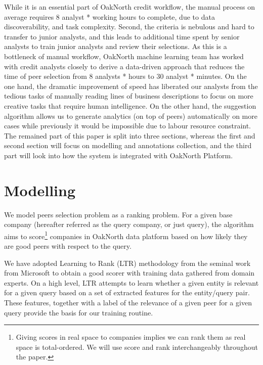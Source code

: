 \documentclass[]{article}
\begin{document}
While it is an essential part of OakNorth credit workflow, the manual process 
on 
average requires 8 analyst * working hours to complete, due to data 
discoverability, and task complexity. Second, the criteria is nebulous and hard 
to transfer to junior analysts, and this leads to additional time spent by 
senior analysts to train junior analysts and review their 
selections. As this is a bottleneck of manual workflow, OakNorth machine 
learning team has worked with credit analysts closely to derive 
a data-driven approach that reduces the time of peer selection from 8 analysts 
* hours to 30 analyst * minutes. On the one hand, the dramatic improvement of 
speed has liberated our analysts from the tedious tasks of manually reading 
lines of business descriptions to focus on more creative 
tasks that require human intelligence. On the other hand, the suggestion 
algorithm allows us to generate analytics (on top of peers) automatically on 
more cases while previously it would be impossible due to labour 
resource constraint. The remained part of this paper is split into three 
sections, 
whereas the first and second section will focus on modelling 
and annotations collection, and the third part will look into how the system 
is integrated with OakNorth Platform. 


\section{Modelling}
We model peers selection problem as a ranking problem. For a given base company 
(hereafter referred as the query company, or just query), the algorithm aims to 
score\footnote{Giving scores in real space to companies implies we can rank 
them as real space is total-ordered. We will use score and rank interchangeably 
throughout the paper.} companies in OakNorth data platform based on how likely 
they are good peers with respect to the query. 

We have adopted Learning to Rank (LTR) methodology from the seminal work from 
Microsoft \cite{burges2005learning} to obtain a good scorer with training data 
gathered from domain experts. On a high level, LTR attempts to learn whether a 
given entity is relevant for a given query based on a set of extracted features 
for the entity/query pair. These features, together with a label of the 
relevance of a given peer for a given query provide the basis for our 
training routine.
\end{document}
